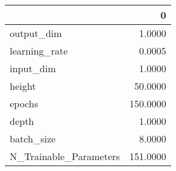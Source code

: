 \begin{tabular}{lr}
\toprule
{} &         0 \\
\midrule
output\_dim             &    1.0000 \\
learning\_rate          &    0.0005 \\
input\_dim              &    1.0000 \\
height                 &   50.0000 \\
epochs                 &  150.0000 \\
depth                  &    1.0000 \\
batch\_size             &    8.0000 \\
N\_Trainable\_Parameters &  151.0000 \\
\bottomrule
\end{tabular}
